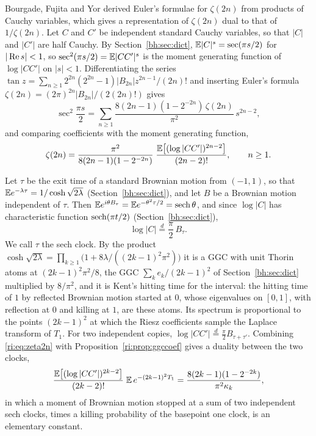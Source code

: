 Bourgade, Fujita and Yor \cite{boBFY} derived Euler's formulae for $\zeta(2n)$ from products of Cauchy variables, which gives a representation of $\zeta(2n)$ dual to that of $1/\zeta(2n)$. Let $C$ and $C'$ be independent standard Cauchy variables, so that $|C|$ and $|C'|$ are half Cauchy. By Section~\ref{bh:sec:dict}, $\mathbb{E}|C|^s=\sec(\pi s/2)$ for $|\operatorname{Re} s|<1$, so $\sec^2(\pi s/2)=\mathbb{E}|CC'|^s$ is the moment generating function of $\log|CC'|$ on $|s|<1$. Differentiating the series $\tan z=\sum_{n\ge1}2^{2n}(2^{2n}-1)|B_{2n}|z^{2n-1}/(2n)!$ and inserting Euler's formula $\zeta(2n)=(2\pi)^{2n}|B_{2n}|/(2(2n)!)$ gives
\[
\sec^2\frac{\pi s}2=\sum_{n\ge1}\frac{8(2n-1)(1-2^{-2n})\,\zeta(2n)}{\pi^2}\,s^{2n-2},
\]
and comparing coefficients with the moment generating function,
\begin{equation}\label{ri:eq:zeta2n}
\zeta(2n)=\frac{\pi^2}{8(2n-1)(1-2^{-2n})}\;\frac{\mathbb{E}\big[(\log|CC'|)^{2n-2}\big]}{(2n-2)!},\qquad n\ge1.
\end{equation}

Let $\tau$ be the exit time of a standard Brownian motion from $(-1,1)$, so that $\mathbb{E} e^{-\lambda\tau}=1/\cosh\sqrt{2\lambda}$ (Section~\ref{bh:sec:dict}), and let $B$ be a Brownian motion independent of $\tau$. Then $\mathbb{E} e^{i\theta B_\tau}=\mathbb{E} e^{-\theta^2\tau/2}=\operatorname{sech}\theta$, and since $\log|C|$ has characteristic function $\operatorname{sech}(\pi t/2)$ (Section~\ref{bh:sec:dict}),
\[
\log|C|\stackrel d=\frac\pi2\,B_\tau .
\]
We call $\tau$ the sech clock. By the product $\cosh\sqrt{2\lambda}=\prod_{k\ge1}\big(1+8\lambda/((2k-1)^2\pi^2)\big)$ it is a GGC with unit Thorin atoms at $(2k-1)^2\pi^2/8$, the GGC $\sum_ke_k/(2k-1)^2$ of Section~\ref{bh:sec:dict} multiplied by $8/\pi^2$, and it is Kent's hitting time for the interval: the hitting time of $1$ by reflected Brownian motion started at $0$, whose eigenvalues on $[0,1]$, with reflection at $0$ and killing at $1$, are these atoms. Its spectrum is proportional to the points $(2k-1)^2$ at which the Riesz coefficients sample the Laplace transform of $T_1$. For two independent copies, $\log|CC'|\stackrel d=\frac\pi2B_{\tau+\tau'}$. Combining \eqref{ri:eq:zeta2n} with Proposition~\ref{ri:prop:ggccoef} gives a duality between the two clocks,
\begin{equation}\label{ri:eq:duality}
\frac{\mathbb{E}\big[(\log|CC'|)^{2k-2}\big]}{(2k-2)!}\;\mathbb{E}\,e^{-(2k-1)^2T_1}=\frac{8(2k-1)(1-2^{-2k})}{\pi^2\kappa_k},
\end{equation}
in which a moment of Brownian motion stopped at a sum of two independent sech clocks, times a killing probability of the basepoint one clock, is an elementary constant.

